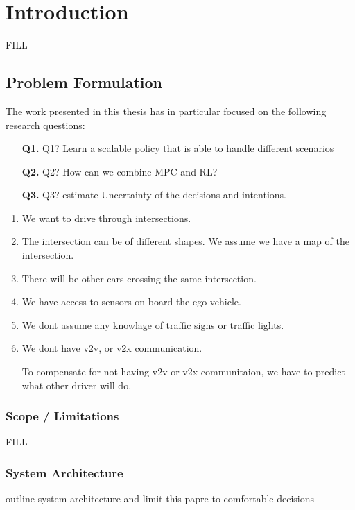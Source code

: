 \chapter{Introduction}\label{chapter:intro}
FILL

\section{Problem Formulation}
The work presented in this thesis has in particular focused on the following research questions:
\begin{enumerate}
	\item[\textbf{Q1.}] Q1? Learn a scalable policy that is able to handle different scenarios 
	\item[\textbf{Q2.}] Q2? How can we combine MPC and RL? 
	\item[\textbf{Q3.}] Q3? estimate Uncertainty of the decisions and intentions.
\end{enumerate}



\begin{enumerate}
	\item We want to drive through intersections. 
	\item The intersection can be of different shapes. We assume we have a map of the intersection. 
	\item There will be other cars crossing the same intersection. 
	\item We have access to sensors on-board the ego vehicle. 
	\item We dont assume any knowlage of traffic signs or traffic lights. 
	\item We dont have v2v, or v2x communication. 
	
	To compensate for not having v2v or v2x communitaion, we have to predict what other driver will do. 
	
\end{enumerate}



\subsection{Scope / Limitations}
FILL

\subsection{System Architecture}
outline system architecture and limit this papre to comfortable decisions 

